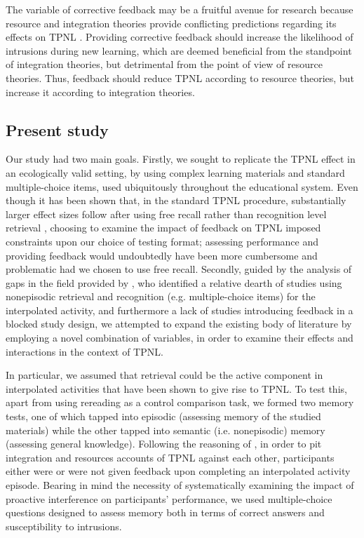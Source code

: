 \documentclass[../main.tex]{subfiles}
\begin{document}
The variable of corrective feedback may be a fruitful avenue for research because resource and integration theories provide conflicting predictions regarding its effects on TPNL \citep{chanRetrievalPotentiatesNew2018}. Providing corrective feedback should increase the likelihood of intrusions during new learning, which are deemed beneficial from the standpoint of integration theories, but detrimental from the point of view of resource theories. Thus, feedback should reduce TPNL according to resource theories, but increase it according to integration theories.


\subsection{Present study\label{present}}

Our study had two main goals. Firstly, we sought to replicate the TPNL effect in
an ecologically valid setting, by using complex learning materials and standard
multiple-choice items, used ubiquitously throughout the educational system. 
Even though it has been shown that, in the standard TPNL procedure, 
substantially larger effect sizes follow after using free recall rather than 
recognition level retrieval \citep{chanRetrievalPotentiatesNew2018}, choosing 
to examine the impact of feedback on TPNL imposed constraints upon our choice 
of testing format; assessing performance and providing feedback would 
undoubtedly have been more cumbersome and problematic had we chosen to use free 
recall. Secondly, guided by the analysis of gaps in the field provided by 
\cite{chanRetrievalPotentiatesNew2018}, who identified a relative dearth of 
studies using nonepisodic retrieval and recognition (e.g. multiple-choice 
items) for the interpolated activity, and furthermore a lack of studies 
introducing feedback in a blocked study design, we attempted to expand the 
existing body of literature by employing a novel combination of variables, in 
order to examine their effects and interactions in the context of TPNL.

In particular, we assumed that retrieval could be the active component in
interpolated activities that have been shown to give rise to TPNL. To test this,
apart from using rereading as a control comparison task,
we formed two memory tests, one of which tapped into episodic
(assessing memory of the studied materials) while the other tapped into semantic
(i.e. nonepisodic) memory (assessing general knowledge). Following the 
reasoning of \cite{chanRetrievalPotentiatesNew2018}, in order to
pit integration and resources accounts of TPNL against each other, participants 
either were or were not given feedback upon completing an interpolated activity 
episode. Bearing in mind the necessity of systematically examining the impact 
of proactive interference on participants' performance, we used multiple-choice 
questions designed to assess memory both in terms of correct answers and 
susceptibility to intrusions.
\end{document}

